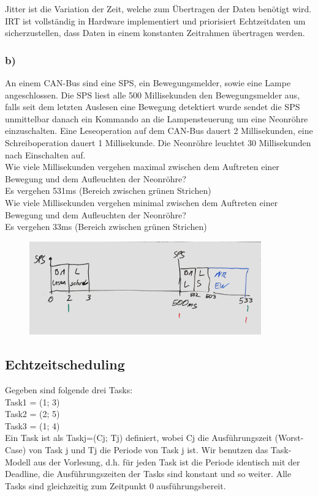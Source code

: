 Jitter ist die Variation der Zeit, welche zum Übertragen der Daten benötigt wird. IRT ist vollständig in Hardware
implementiert und priorisiert Echtzeitdaten um sicherzustellen, dass Daten in einem konstanten Zeitrahmen übertragen werden.

\subsubsection{b)}
An einem CAN-Bus sind eine SPS, ein Bewegungsmelder, sowie eine Lampe angeschlossen. Die SPS liest
alle 500 Millisekunden den Bewegungsmelder aus, falls seit dem letzten Auslesen eine Bewegung
detektiert wurde sendet die SPS unmittelbar danach ein Kommando an die Lampensteuerung um eine
Neonröhre einzuschalten. Eine Leseoperation auf dem CAN-Bus dauert 2 Millisekunden, eine
Schreiboperation dauert 1 Millisekunde. Die Neonröhre leuchtet 30 Millisekunden nach Einschalten
auf.\\

Wie viele Millisekunden vergehen maximal zwischen dem Auftreten einer Bewegung und dem
Aufleuchten der Neonröhre?\\
Es vergehen 531ms (Bereich zwischen grünen Strichen)\\
Wie viele Millisekunden vergehen minimal zwischen dem Auftreten einer Bewegung und dem
Aufleuchten der Neonröhre?\\
Es vergehen 33ms (Bereich zwischen grünen Strichen)

\begin{figure}[H]
  \includegraphics[width=10cm]{images/KA160322/2b.jpg}
  \centering
\end{figure}

\subsection{Echtzeitscheduling}
Gegeben sind folgende drei Tasks:\\
Task1 = (1; 3)\\
Task2 = (2; 5)\\
Task3 = (1; 4)\\
Ein Task ist als Taskj=(Cj; Tj) definiert, wobei Cj die Ausführungszeit (Worst-Case) von Task j und Tj die
Periode von Task j ist. Wir benutzen das Task-Modell aus der Vorlesung, d.h. für jeden Task ist die Periode
identisch mit der Deadline, die Ausführungszeiten der Tasks sind konstant und so weiter. Alle Tasks sind
gleichzeitig zum Zeitpunkt 0 ausführungsbereit.

